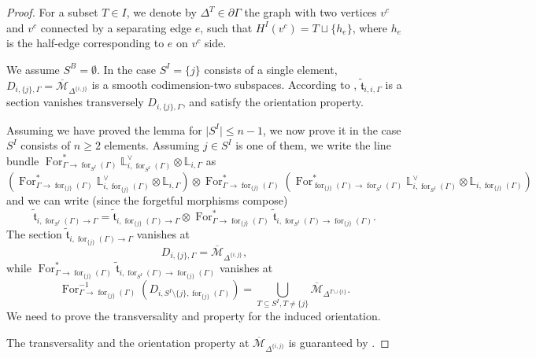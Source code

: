 \documentclass[11pt]{amsart}
\theoremstyle{definition}
\theoremstyle{remark}
\renewcommand{\for}{\operatorname{for}}
\newcommand{\For}{\operatorname{For}}
\newcommand{\<}{\left<}
\renewcommand{\>}{\right>}
\numberwithin{equation}{section}
\def\Mbar{{\overline{\mathcal M}}}
\begin{document}
\begin{proof}
 For %
a subset $T\in I$, we denote by $\Delta^{T}\in \partial {\Gamma}$ the graph with two vertices $v^c$ and $v^c$ connected by a separating edge $e$, such that $H^I(v^c)=T\sqcup \{h_e\}$, where $h_e$ is the half-edge corresponding to $e$ on $v^c$ side.

We assume $S^B=\emptyset$. In the case $S^I=\{j\}$ consists of a single element, $D_{i,\{j\},\Gamma}=\Mbar_{\Delta^{\{i,j\}}}$ is a smooth codimension-two subspaces. According to \cite[Lemma 3.43]{PST14}, $\tilde{\mathfrak t}_{i,{i},\Gamma}$ is a section vanishes transversely $D_{i,\{j\},\Gamma}$, and satisfy the orientation property.

Assuming we have proved the lemma for $\lvert S^I\rvert\le n-1$, we now prove it in the case $S^I$ consists of $n\ge 2$ elements. Assuming $j\in S^I$ is one of them, we write the line bundle $\For_{\Gamma\to \for_{{S^I}}(\Gamma)}^* \mathbb L_{i,\for_{S^I}(\Gamma)}^\vee \otimes \mathbb L_{i,\Gamma}$ as
$$(\For_{\Gamma\to \for_{\{j\}}(\Gamma)}^* \mathbb L_{i,\for_{\{j\}}(\Gamma)}^\vee \otimes \mathbb L_{i,\Gamma})\otimes \For_{\Gamma\to \for_{\{j\}}(\Gamma)}^*(\For_{\for_{\{j\}}(\Gamma)\to \for_{S^I}(\Gamma)}^* \mathbb L_{i,\for_{S^I}(\Gamma)}^\vee \otimes \mathbb L_{i,\for_{\{j\}}(\Gamma)})$$
and we can write (since the forgetful morphisms compose)
$$\tilde{\mathfrak t}_{i,\for_{S^I}(\Gamma)\to\Gamma}= \tilde{\mathfrak t}_{i,\for_{\{j\}}(\Gamma)\to\Gamma}\otimes  \For_{\Gamma\to \for_{\{j\}}(\Gamma)}^* \tilde{\mathfrak t}_{i,\for_{S^I}(\Gamma)\to \for_{\{j\}}(\Gamma)}.$$
The section $\tilde{\mathfrak t}_{i,\for_{\{j\}}(\Gamma)\to\Gamma}$ vanishes at $$D_{i,\{j\},\Gamma}=\Mbar_{\Delta^{\{i,j\}}},$$ 
while $\For_{\Gamma\to \for_{\{j\}}(\Gamma)}^* \tilde{\mathfrak t}_{i,\for_{S^I}(\Gamma)\to \for_{\{j\}}(\Gamma)}$ vanishes at $$\For_{\Gamma \to \for_{\{j\}}(\Gamma)}^{-1}(D_{i,S^I\setminus\{j\},\for_{\{j\}}(\Gamma)})=\bigcup_{T\subseteq S^I, T\ne \{j\}}\Mbar_{\Delta^{T\sqcup\{i\}}}.$$
We need to prove the transversality and property for the induced orientation.  

The transversality and the orientation property at $\Mbar_{\Delta^{\{i,j\}}}$ is guaranteed by \cite[Lemma 3.43]{PST14}.


\end{proof}
\end{document}
